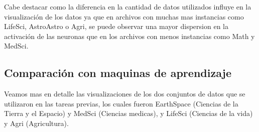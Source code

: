 \documentclass{article}
\theoremstyle{mytheoremstyle}
\theoremstyle{mytheoremstyle}
\theoremstyle{myproblemstyle}
\begin{document}
Cabe destacar como la diferencia en la cantidad de datos utilizados influye en la visualización de los datos ya que en archivos con muchas mas instancias como LifeSci, AstroAstro o Agri, se puede observar una mayor dispersion en la activación de las neuronas que en los archivos con menos instancias como Math y MedSci.

\subsection*{Comparación con maquinas de aprendizaje}

Veamos mas en detalle las visualizaciones de los dos conjuntos de datos que se utilizaron en las tareas previas, los cuales fueron EarthSpace (Ciencias de la Tierra y el Espacio) y MedSci (Ciencias medicas), y LifeSci (Ciencias de la vida) y Agri (Agricultura).
\end{document}
